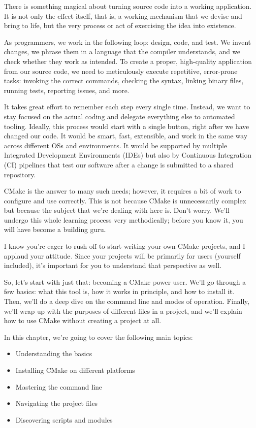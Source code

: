 There is something magical about turning source code into a working application. It is not only the effect itself, that is, a working mechanism that we devise and bring to life, but the very process or act of exercising the idea into existence.

As programmers, we work in the following loop: design, code, and test. We invent changes, we phrase them in a language that the compiler understands, and we check whether they work as intended. To create a proper, high-quality application from our source code, we need to meticulously execute repetitive, error-prone tasks: invoking the correct commands, checking the syntax, linking binary files, running tests, reporting issues, and more.

It takes great effort to remember each step every single time. Instead, we want to stay focused on the actual coding and delegate everything else to automated tooling. Ideally, this process would start with a single button, right after we have changed our code. It would be smart, fast, extensible, and work in the same way across different OSs and environments. It would be supported by multiple Integrated Development Environments (IDEs) but also by Continuous Integration (CI) pipelines that test our software after a change is submitted to a shared repository.

CMake is the answer to many such needs; however, it requires a bit of work to configure and use correctly. This is not because CMake is unnecessarily complex but because the subject that we're dealing with here is. Don't worry. We'll undergo this whole learning process very methodically; before you know it, you will have become a building guru.

I know you're eager to rush off to start writing your own CMake projects, and I applaud your attitude. Since your projects will be primarily for users (yourself included), it's important for you to understand that perspective as well.

So, let's start with just that: becoming a CMake power user. We'll go through a few basics: what this tool is, how it works in principle, and how to install it. Then, we'll do a deep dive on the command line and modes of operation. Finally, we'll wrap up with the purposes of different files in a project, and we'll explain how to use CMake without creating a project at all.

In this chapter, we're going to cover the following main topics:

\begin{itemize}
\item 
Understanding the basics

\item 
Installing CMake on different platforms

\item 
Mastering the command line

\item 
Navigating the project files

\item 
Discovering scripts and modules
\end{itemize}

